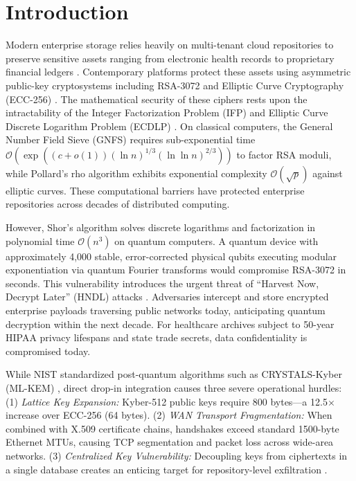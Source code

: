 \documentclass{llncs}
\begin{document}
\section{Introduction}
Modern enterprise storage relies heavily on multi-tenant cloud repositories to preserve sensitive assets ranging from electronic health records to proprietary financial ledgers \cite{mell2011nist}. Contemporary platforms protect these assets using asymmetric public-key cryptosystems including RSA-3072 and Elliptic Curve Cryptography (ECC-256) \cite{boneh2020graduate}. The mathematical security of these ciphers rests upon the intractability of the Integer Factorization Problem (IFP) and Elliptic Curve Discrete Logarithm Problem (ECDLP) \cite{katz2020introduction}. On classical computers, the General Number Field Sieve (GNFS) requires sub-exponential time $\mathcal{O}(\exp((c + o(1))(\ln n)^{1/3}(\ln \ln n)^{2/3}))$ to factor RSA moduli, while Pollard's rho algorithm exhibits exponential complexity $\mathcal{O}(\sqrt{p})$ against elliptic curves. These computational barriers have protected enterprise repositories across decades of distributed computing.

However, Shor's algorithm \cite{shor1994algorithms} solves discrete logarithms and factorization in polynomial time $\mathcal{O}(n^3)$ on quantum computers. A quantum device with approximately 4,000 stable, error-corrected physical qubits executing modular exponentiation via quantum Fourier transforms would compromise RSA-3072 in seconds. This vulnerability introduces the urgent threat of ``Harvest Now, Decrypt Later'' (HNDL) attacks \cite{mosca2022quantum}. Adversaries intercept and store encrypted enterprise payloads traversing public networks today, anticipating quantum decryption within the next decade. For healthcare archives subject to 50-year HIPAA privacy lifespans and state trade secrets, data confidentiality is compromised today.

While NIST standardized post-quantum algorithms such as CRYSTALS-Kyber (ML-KEM) \cite{bos2018crystals,avanzi2021crystals}, direct drop-in integration causes three severe operational hurdles: (1) \emph{Lattice Key Expansion:} Kyber-512 public keys require 800 bytes---a 12.5$\times$ increase over ECC-256 (64 bytes). (2) \emph{WAN Transport Fragmentation:} When combined with X.509 certificate chains, handshakes exceed standard 1500-byte Ethernet MTUs, causing TCP segmentation and packet loss across wide-area networks. (3) \emph{Centralized Key Vulnerability:} Decoupling keys from ciphertexts in a single database creates an enticing target for repository-level exfiltration \cite{sahai2021use}.
\end{document}
